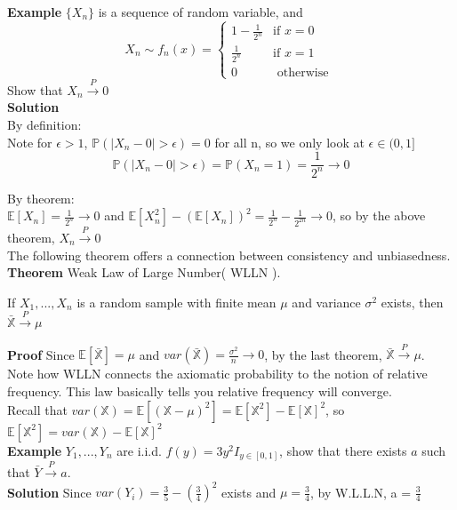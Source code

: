 \documentclass[a4paper,12pt]{article}
\begin{document}
\textbf{Example} $\{X_n\}$ is a sequence of random variable, and
$$X_n \sim f_n(x) =
\begin{cases}
1-\frac{1}{2^n} & \text{if } x=0 \\
\frac{1}{2^n} & \text{if } x=1 \\
0 & \text{ otherwise }
\end{cases}$$
Show that $X_n \overset{P}{\to} 0$\\

\textbf{Solution} \\

By definition:\\
Note for $\epsilon > 1$, $\mathbb{P}( |X_n - 0| > \epsilon ) = 0$ for all n, so we only look at $\epsilon\in(0, 1]$\\
$$\mathbb{P}( |X_n - 0| > \epsilon ) = \mathbb{P}( X_n = 1 ) = \frac{1}{2^n} \to 0$$

By theorem:\\
$\mathbb{E}[X_n] = \frac{1}{2^n} \to 0$ and $\mathbb{E}[X_n^2]-(\mathbb{E}[X_n])^2 = \frac{1}{2^n} - \frac{1}{2^{2n}} \to 0$, so by the above theorem, $X_n \overset{P}{\to} 0$\\

The following theorem offers a connection between consistency and unbiasedness.\\

\textbf{Theorem} Weak Law of Large Number( WLLN ).

If $X_1, ..., X_n$ is a random sample with finite mean $\mu$ and variance $\sigma^2$ exists, then $\bar{\mathbb{X}} \overset{P}{\to} \mu$

\textbf{Proof} Since $\mathbb{E}[\bar{\mathbb{X}}] = \mu$ and $var(\bar{\mathbb{X}}) = \frac{\sigma^2}{n} \to 0$, by the last theorem, $\bar{\mathbb{X}} \overset{P}{\to} \mu$.\\

Note how WLLN connects the axiomatic probability to the notion of relative frequency. This law basically tells you relative frequency will converge.\\

Recall that $var(\mathbb{X}) = \mathbb{E}[(\mathbb{X}-\mu)^2] = \mathbb{E}[\mathbb{X}^2] - \mathbb{E}[\mathbb{X}]^2$, so $ \mathbb{E}[\mathbb{X}^2] = var(\mathbb{X}) - \mathbb{E}[\mathbb{X}]^2$\\

\textbf{Example} $Y_1, ..., Y_n$ are i.i.d. $f(y) = 3y^2 I_{y\in[0,1]}$, show that there exists $a$ such that $\bar{Y} \overset{P} {\to} a$.\\
\textbf{Solution} Since $var(Y_i) = \frac{3}{5}-(\frac{3}{4})^2$ exists and $\mu = \frac{3}{4}$, by W.L.L.N, a = $\frac{3}{4}$\\
\end{document}
